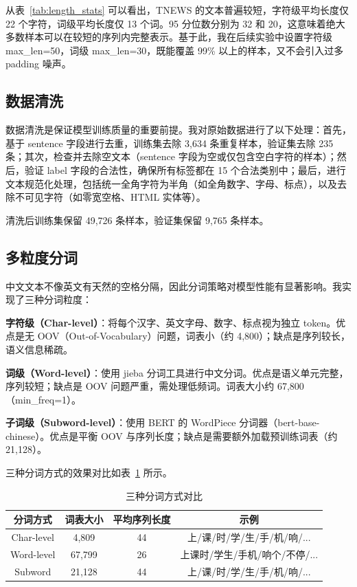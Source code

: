 \documentclass[a4paper]{article}
\begin{document}
从表~\ref{tab:length_stats} 可以看出，TNEWS 的文本普遍较短，字符级平均长度仅 22 个字符，词级平均长度仅 13 个词。95 分位数分别为 32 和 20，这意味着绝大多数样本可以在较短的序列内完整表示。基于此，我在后续实验中设置字符级 max\_len=50，词级 max\_len=30，既能覆盖 99\% 以上的样本，又不会引入过多 padding 噪声。

\subsection{数据清洗}

数据清洗是保证模型训练质量的重要前提。我对原始数据进行了以下处理：首先，基于 sentence 字段进行去重，训练集去除 3,634 条重复样本，验证集去除 235 条；其次，检查并去除空文本（sentence 字段为空或仅包含空白字符的样本）；然后，验证 label 字段的合法性，确保所有标签都在 15 个合法类别中；最后，进行文本规范化处理，包括统一全角字符为半角（如全角数字、字母、标点），以及去除不可见字符（如零宽空格、HTML 实体等）。

清洗后训练集保留 49,726 条样本，验证集保留 9,765 条样本。

\subsection{多粒度分词}

中文文本不像英文有天然的空格分隔，因此分词策略对模型性能有显著影响。我实现了三种分词粒度：

\textbf{字符级（Char-level）}：将每个汉字、英文字母、数字、标点视为独立 token。优点是无 OOV（Out-of-Vocabulary）问题，词表小（约 4,800）；缺点是序列较长，语义信息稀疏。

\textbf{词级（Word-level）}：使用 jieba 分词工具进行中文分词。优点是语义单元完整，序列较短；缺点是 OOV 问题严重，需处理低频词。词表大小约 67,800（min\_freq=1）。

\textbf{子词级（Subword-level）}：使用 BERT 的 WordPiece 分词器（bert-base-chinese）。优点是平衡 OOV 与序列长度；缺点是需要额外加载预训练词表（约 21,128）。

三种分词方式的效果对比如表~\ref{tab:tokenizer} 所示。

\begin{table}[H]
    \centering
    \small
    \begin{tabular}{|c|c|c|c|}
        \hline
        \textbf{分词方式} & \textbf{词表大小} & \textbf{平均序列长度} & \textbf{示例} \\
        \hline
        Char-level & 4,809 & 44 & 上/课/时/学/生/手/机/响/... \\
        Word-level & 67,799 & 26 & 上课时/学生/手机/响个/不停/... \\
        Subword & 21,128 & 44 & 上/课/时/学/生/手/机/响/... \\
        \hline
    \end{tabular}
    \caption{三种分词方式对比}
    \label{tab:tokenizer}
\end{table}
\end{document}
